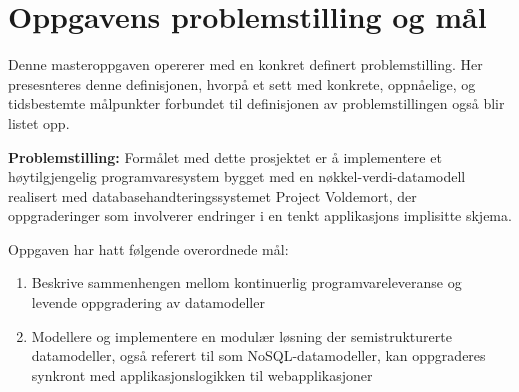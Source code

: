 \section{Oppgavens problemstilling og mål}

Denne masteroppgaven opererer med en konkret definert problemstilling. Her presesnteres denne definisjonen, hvorpå et sett med konkrete, oppnåelige, og tidsbestemte målpunkter forbundet til definisjonen av problemstillingen også blir listet opp.

\textbf{Problemstilling:} Formålet med dette prosjektet er å implementere et høytilgjengelig programvaresystem bygget med en nøkkel-verdi-datamodell realisert med databasehandteringssystemet Project Voldemort, der oppgraderinger som involverer endringer i en tenkt applikasjons implisitte skjema.

Oppgaven har hatt følgende overordnede mål:

\begin{enumerate}
  \item Beskrive sammenhengen mellom kontinuerlig programvareleveranse og \\ levende oppgradering av datamodeller %
  \item Modellere og implementere en modulær løsning der semistrukturerte datamodeller, også referert til som NoSQL-datamodeller, kan oppgraderes synkront med applikasjonslogikken til webapplikasjoner %
\end{enumerate}




